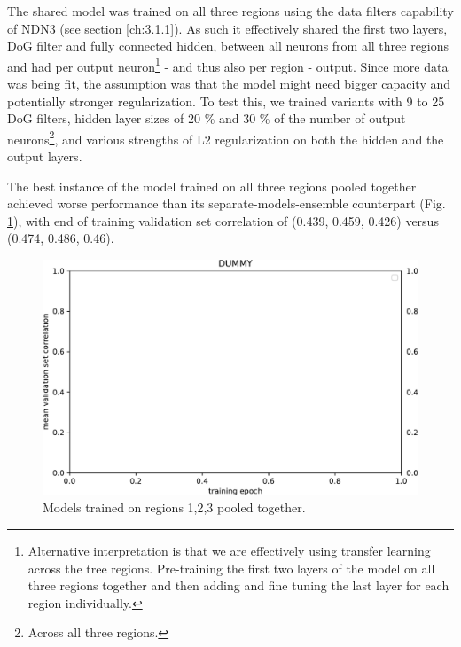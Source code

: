 The shared model was trained on all three regions using the data filters capability of NDN3 (see section \ref{ch:3.1.1}). As such it effectively shared the first two layers, DoG filter and fully connected hidden, between all neurons from all three regions and had per output neuron\footnote{Alternative interpretation is that we are effectively using transfer learning across the tree regions. Pre-training the first two layers of the model on all three regions together and then adding and fine tuning the last layer for each region individually.} - and thus also per region - output. Since more data was being fit, the assumption was that the model might need bigger capacity and potentially stronger regularization. To test this, we trained variants with 9 to 25 DoG filters, hidden layer sizes of 20 \% and 30 \% of the number of output neurons\footnote{Across all three regions.}, and various strengths of L2 regularization on both the hidden and the output layers. 

The best instance of the model trained on all three regions pooled together achieved worse performance than its separate-models-ensemble counterpart (Fig. \ref{fig:5.3.1.1_1}), with end of training validation set correlation of (0.439, 0.459, 0.426) versus (0.474, 0.486, 0.46). 

\begin{figure}[H]
    \centering
    \includegraphics[width=1\textwidth]{../figures/05_dummy}
    \caption[Experiment 5.3.1.1]{Models trained on regions 1,2,3 pooled together\protect\footnotemark.}
    \label{fig:5.3.1.1_1}
\end{figure}

